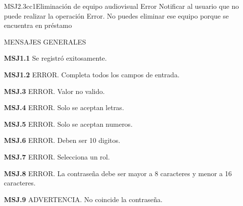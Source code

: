 	\begin{Message}{MSJ2.3cc1}{Eliminación de equipo audiovisual}
		\MSGitem[Tipo:] Error	
		\MSGitem[Objetivo: ] Notificar al usuario que no puede realizar la operación
		\MSGitem[Redacción: ] Error. No puedes eliminar ese equipo porque se encuentra en préstamo
	\end{Message}
	

MENSAJES GENERALES
	\begin{Citemize}
	\item {\bf MSJ1.1} Se registró exitosamente.
	\end{Citemize}
	
	\begin{Citemize}
	\item {\bf MSJ1.2} ERROR. Completa todos los campos de entrada.
	\end{Citemize}
	
	\begin{Citemize}
	\item {\bf MSJ.3} ERROR. Valor no valido.
	\end{Citemize}
	
	\begin{Citemize}
	\item {\bf MSJ.4} ERROR. Solo se aceptan letras.
	\end{Citemize}
	
	\begin{Citemize}
	\item {\bf MSJ.5} ERROR. Solo se aceptan numeros.
	\end{Citemize}
	
	\begin{Citemize}
	\item {\bf MSJ.6} ERROR. Deben ser 10 digitos.
	\end{Citemize}
	
	\begin{Citemize}
	\item {\bf MSJ.7} ERROR. Selecciona un rol.
	\end{Citemize}
	
	\begin{Citemize}
	\item {\bf MSJ.8} ERROR. La contraseña debe ser mayor a 8 caracteres y menor a 16 caracteres.
	\end{Citemize}
	
	\begin{Citemize}
	\item {\bf MSJ.9} ADVERTENCIA. No coincide la contraseña.
	\end{Citemize}
	
